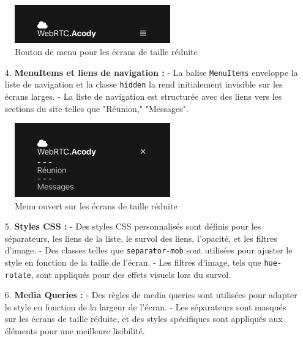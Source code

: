 \documentclass[12pt, a4paper, oneside]{article}
\begin{document}
\begin{figure}[h]
    \centering
    \includegraphics[width=0.6\textwidth]{images/NavBarMobileClose.png}
    \caption{Bouton de menu pour les écrans de taille réduite}
\end{figure}

\begin{enumerate}
    \item[4.] \textbf{MenuItems et liens de navigation :}
    - La balise \texttt{MenuItems} enveloppe la liste de navigation et la classe \texttt{hidden} la rend initialement invisible sur les écrans larges.
    - La liste de navigation est structurée avec des liens vers les sections du site telles que "Réunion," "Messages".

\end{enumerate}

\begin{figure}[h]
    \centering
    \includegraphics[width=0.6\textwidth]{images/NavBarMobileOpen.png}
    \caption{Menu ouvert sur les écrans de taille réduite}
\end{figure}

\begin{enumerate}
    \item[5.] \textbf{Styles CSS :}
    - Des styles CSS personnalisés sont définis pour les séparateurs, les liens de la liste, le survol des liens, l'opacité, et les filtres d'image.
    - Des classes telles que \texttt{separator-mob} sont utilisées pour ajuster le style en fonction de la taille de l'écran.
    - Les filtres d'image, tels que \texttt{hue-rotate}, sont appliqués pour des effets visuels lors du survol.

    \item[6.] \textbf{Media Queries :}
    - Des règles de media queries sont utilisées pour adapter le style en fonction de la largeur de l'écran.
    - Les séparateurs sont masqués sur les écrans de taille réduite, et des styles spécifiques sont appliqués aux éléments pour une meilleure lisibilité.
\end{enumerate}
\end{document}
